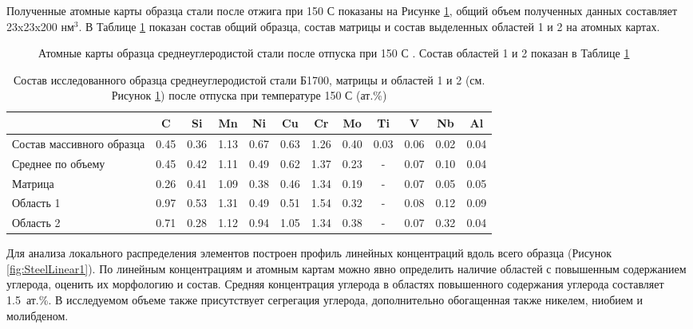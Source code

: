 Полученные атомные карты образца стали после отжига при 150 \textdegree С показаны на Рисунке \cref{fig:SteelAtomMaps1}, общий объем полученных данных составляет 23x23x200 нм$^{3}$. В Таблице \cref{tab:SteelComposition150} показан состав общий образца, состав матрицы и состав выделенных областей 1 и 2 на атомных картах.

\begin{figure}[ht]
	\caption{Атомные карты образца среднеуглеродистой стали после отпуска при 150 \textdegree С \cite{scbibRyabov}. Состав областей 1 и 2 показан в Таблице \cref{tab:SteelComposition150} }
	\label{fig:SteelAtomMaps1}
\end{figure} 

\begin{table} [htbp]
	\centering
	\caption{Состав исследованного образца среднеуглеродистой стали Б1700, матрицы и областей 1 и 2 (см. Рисунок \cref{fig:SteelAtomMaps1}) после отпуска при температуре 150 \textdegree С (ат.\%)}%
	\label{tab:SteelComposition150}%
	\begin{SingleSpace}
		\begin{tabular}{|p{3cm}| c | c | c | c | c | c | c | c | c | c | c |}
			\hline
			& C & Si & Mn & Ni & Cu & Cr & Mo & Ti & V & Nb & Al     \\ \hline
			Состав массивного образца     & 0.45 & 0.36 & 1.13 & 0.67 & 0.63 & 1.26 & 0.40 & 0.03 & 0.06 & 0.02 & 0.04   \\ \hline
			Среднее по объему   & 0.45 & 0.42 & 1.11 & 0.49 & 0.62 & 1.37 & 0.23 & - & 0.07 & 0.10 & 0.04   \\  \hline		
			Матрица   & 0.26 & 0.41 & 1.09 & 0.38 & 0.46 & 1.34 & 0.19 & - & 0.07 & 0.05 & 0.05   \\  \hline	
			Область 1   & 0.97 & 0.53 & 1.31 & 0.49 & 0.51 & 1.54 & 0.32 & - & 0.08 & 0.12 & 0.09   \\  \hline
			Область 2   & 0.71 & 0.28 & 1.12 & 0.94 & 1.05 & 1.34 & 0.38 & - & 0.07 & 0.32 & 0.04   \\  \hline	
		\end{tabular}%
	\end{SingleSpace}
\end{table}

Для анализа локального распределения элементов построен профиль линейных концентраций вдоль всего образца (Рисунок \cref{fig:SteelLinear1}). По линейным концентрациям и атомным картам можно явно определить наличие областей с повышенным содержанием углерода, оценить их морфологию и состав. Средняя концентрация углерода в областях повышенного содержания углерода составляет 1.5~ат.\%. В исследуемом объеме также присутствует сегрегация углерода, дополнительно обогащенная также никелем, ниобием и молибденом.

